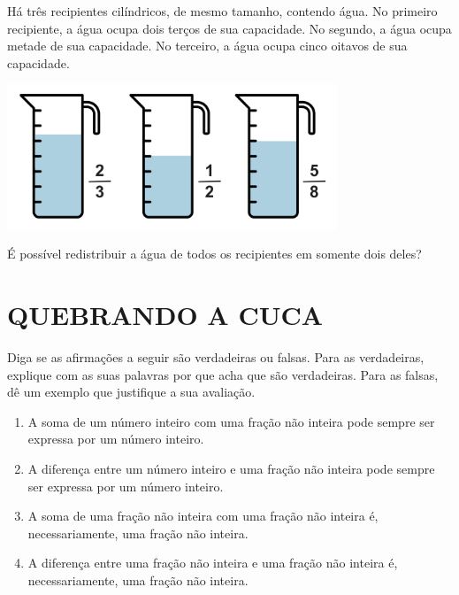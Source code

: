 \begin{atividade}{}

Há três recipientes cilíndricos, de mesmo tamanho, contendo água. No primeiro recipiente, a água ocupa dois terços de sua capacidade. No segundo, a água ocupa metade de sua capacidade. No terceiro, a água ocupa cinco oitavos de sua capacidade.

\begin{center}
  \includegraphics[width=280pt, keepaspectratio]{../figuras/licao05/ativ14_fig01.png}
\end{center}

É possível redistribuir a água de todos os recipientes em somente dois deles?
\end{atividade}

\section{QUEBRANDO A CUCA }


\begin{atividade}{}

Diga se as afirmações a seguir são verdadeiras ou falsas. Para as verdadeiras, explique com as suas palavras por que acha que são verdadeiras. Para as falsas, dê um exemplo que justifique a sua avaliação.
\begin{enumerate} [\quad a)] %
  \item     A soma de um número inteiro com uma fração não inteira pode sempre ser expressa por um número inteiro.
  \item     A diferença entre um número inteiro e uma fração não inteira pode sempre ser expressa por um número inteiro.
  \item     A soma de uma fração não inteira com uma fração não inteira é, necessariamente, uma fração não inteira.
  \item     A diferença entre uma fração não inteira e uma fração não inteira é, necessariamente, uma fração não inteira.
\end{enumerate} %
\end{atividade}

